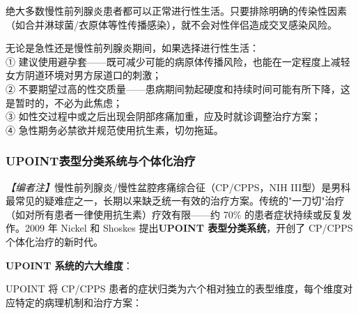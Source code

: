 \begin{enumerate}
绝大多数慢性前列腺炎患者都可以正常进行性生活。只要排除明确的传染性因素（如合并淋球菌/衣原体等性传播感染），就不会对性伴侣造成交叉感染风险。

\begin{tcolorbox}[colback=pink!5!white,colframe=red!50!black,title=贴心小叮咛]
无论是急性还是慢性前列腺炎期间，如果选择进行性生活：\\
① 建议使用避孕套——既可减少可能的病原体传播风险，也能在一定程度上减轻女方阴道环境对男方尿道口的刺激；\\
② 不要期望过高的性交质量——患病期间勃起硬度和持续时间可能有所下降，这是暂时的，不必为此焦虑；\\
③ 如性交过程中或之后出现会阴部疼痛加重，应及时就诊调整治疗方案；\\
④ 急性期务必禁欲并规范使用抗生素，切勿拖延。
\end{tcolorbox}

\subsubsection{UPOINT表型分类系统与个体化治疗}
\label{subsec:upoint}

\noindent\textit{【编者注】}慢性前列腺炎/慢性盆腔疼痛综合征（CP/CPPS，NIH III型）是男科最常见的疑难症之一，长期以来缺乏统一有效的治疗方案。传统的"一刀切"治疗（如对所有患者一律使用抗生素）疗效有限——约 70\% 的患者症状持续或反复发作。2009 年 Nickel 和 Shoskes 提出\textbf{UPOINT 表型分类系统}，开创了 CP/CPPS 个体化治疗的新时代。

\vspace{0.5em}
\noindent\textbf{UPOINT 系统的六大维度}：

UPOINT 将 CP/CPPS 患者的症状归类为六个相对独立的表型维度，每个维度对应特定的病理机制和治疗方案：


\end{enumerate}
